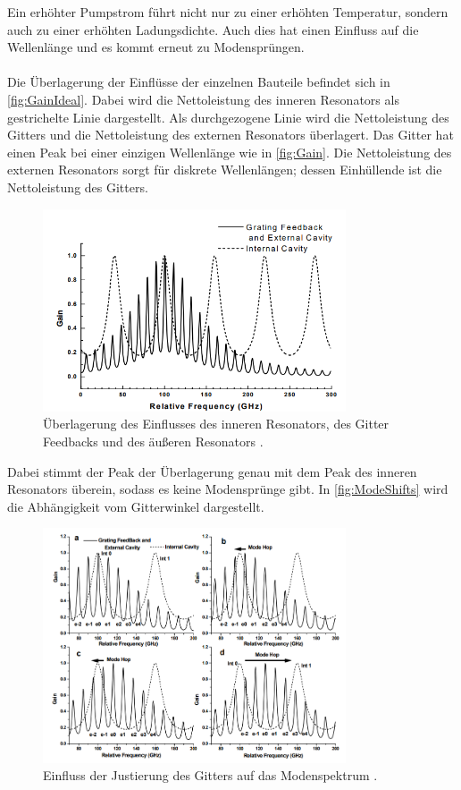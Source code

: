 Ein erhöhter Pumpstrom führt nicht nur zu einer erhöhten Temperatur, sondern auch zu einer erhöhten 
Ladungsdichte. Auch dies hat einen Einfluss auf die Wellenlänge und es kommt erneut zu Modensprüngen.
\\
\\
Die Überlagerung der Einflüsse der einzelnen Bauteile befindet sich in \autoref{fig:GainIdeal}. 
Dabei wird die Nettoleistung des inneren Resonators als gestrichelte Linie dargestellt. Als durchgezogene 
Linie wird die Nettoleistung des Gitters und die Nettoleistung des externen Resonators überlagert. 
Das Gitter hat einen Peak bei einer einzigen Wellenlänge wie in \autoref{fig:Gain}. Die Nettoleistung des externen
Resonators sorgt für diskrete Wellenlängen; dessen Einhüllende ist die Nettoleistung des Gitters.
\begin{figure}
    \centering
    \includegraphics[width=0.8\textwidth]{CavityIdeal.png}
    \caption{Überlagerung des Einflusses des inneren Resonators, des Gitter Feedbacks und des äußeren Resonators \cite{ap60}.}
    \label{fig:GainIdeal}
\end{figure}
Dabei stimmt der Peak der Überlagerung genau mit dem Peak des inneren Resonators überein, sodass es keine Modensprünge gibt.
In \autoref{fig:ModeShifts} wird die Abhängigkeit vom Gitterwinkel dargestellt.
\begin{figure}
    \centering
    \includegraphics[width=0.8\textwidth]{ModeShifts.png}
    \caption{Einfluss der Justierung des Gitters auf das Modenspektrum \cite{ap60}.}
    \label{fig:ModeShifts}
\end{figure}
